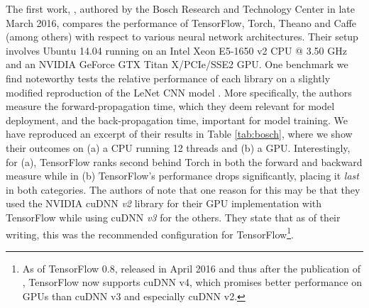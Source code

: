 The first work, \cite{bosch}, authored by the Bosch Research and Technology
Center in late March 2016, compares the performance of TensorFlow, Torch, Theano
and Caffe (among others) with respect to various neural network architectures.
Their setup involves Ubuntu 14.04 running on an Intel Xeon E5-1650 v2 CPU @ 3.50
GHz and an NVIDIA GeForce GTX Titan X/PCIe/SSE2 GPU. One benchmark we find
noteworthy tests the relative performance of each library on a slightly modified
reproduction of the LeNet CNN model \cite{lenet}. More specifically, the authors
measure the forward-propagation time, which they deem relevant for model
deployment, and the back-propagation time, important for model training. We have
reproduced an excerpt of their results in Table \ref{tab:bosch}, where we show
their outcomes on (a) a CPU running 12 threads and (b) a GPU. Interestingly, for
(a), TensorFlow ranks second behind Torch in both the forward and backward
measure while in (b) TensorFlow's performance drops significantly, placing it
\emph{last} in both categories. The authors of \cite{bosch} note that one reason
for this may be that they used the NVIDIA cuDNN \emph{v2} library for their GPU
implementation with TensorFlow while using cuDNN \emph{v3} for the others. They
state that as of their writing, this was the recommended configuration for
TensorFlow\footnote{As of TensorFlow 0.8, released in April 2016 and thus after
  the publication of \cite{bosch}, TensorFlow now supports cuDNN v4, which
  promises better performance on GPUs than cuDNN v3 and especially cuDNN v2.}.

